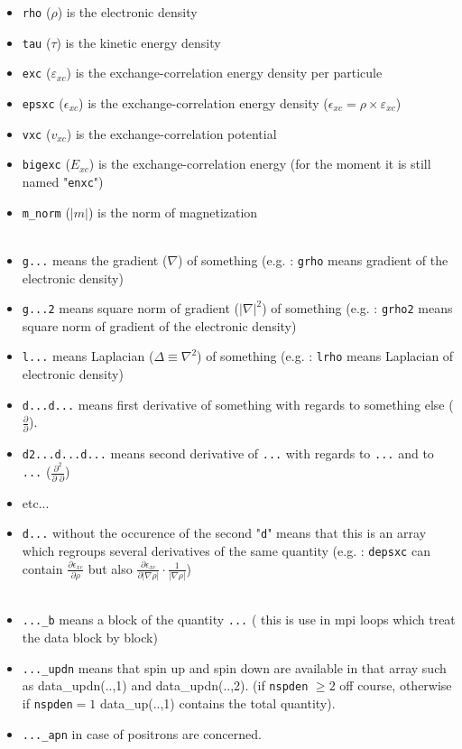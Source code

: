 \documentclass[a4paper,12pt]{report}
\begin{document}
\begin{itemize}
 \item \texttt{rho} ($\rho$) is the electronic density
 \item \texttt{tau} ($\tau$) is the kinetic energy density
 \item \texttt{exc} ($\varepsilon_{xc}$) is the exchange-correlation energy density per particule
 \item \texttt{epsxc} ($\epsilon_{xc}$) is the exchange-correlation energy density ($\epsilon_{xc}=\rho\times\varepsilon_{xc}$)
 \item \texttt{vxc} ($v_{xc}$) is the exchange-correlation potential
 \item \texttt{bigexc} ($E_{xc}$) is the exchange-correlation energy (for the moment it is still named "\texttt{enxc}")
 \item \texttt{m\_norm} ($\vert m \vert$) is the norm of magnetization\\\\

 \item \texttt{g...} means the gradient ($\nabla$) of something (e.g. : \texttt{grho} means gradient of the electronic density)
 \item \texttt{g...2} means square norm of gradient ($\vert \nabla \vert^2$) of something (e.g. : \texttt{grho2}  means square norm of gradient of the electronic density)
 \item \texttt{l...} means Laplacian ($\Delta \equiv \nabla^2$) of something (e.g. : \texttt{lrho} means Laplacian of electronic density)
 \item \texttt{d...d...} means first derivative of something with regards to something else ($\frac{\partial}{\partial}$).
 \item \texttt{d2...d...d...} means second derivative of \texttt{...} with regards to \texttt{...} and to \texttt{...} ($\frac{\partial^2}{\partial\,\,\partial}$)
 \item etc...
 \item \texttt{d...} without the occurence of the second "\texttt{d}" means that this is an array which regroups several derivatives of the same quantity (e.g. : \texttt{depsxc} can contain $\frac{\partial \epsilon_{xc}}{\partial \rho}$ but also $\frac{\partial \epsilon_{xc}}{\partial \vert \nabla \rho\vert}\cdotp \frac{1}{\vert \nabla \rho\vert}$)\\\\

 \item \texttt{...\_b} means a block of the quantity \texttt{...} ( this is use in mpi loops which treat the data block by block)
 \item \texttt{...\_updn} means that spin up and spin down are available in that array such as data\_updn(..,1) and data\_updn(..,2). (if \texttt{nspden} $\geq2$ off course, otherwise if \texttt{nspden}$=1$ data\_up(..,1) contains the total quantity).
 \item \texttt{...\_apn} in case of positrons are concerned.\\


\end{itemize}
\end{document}
